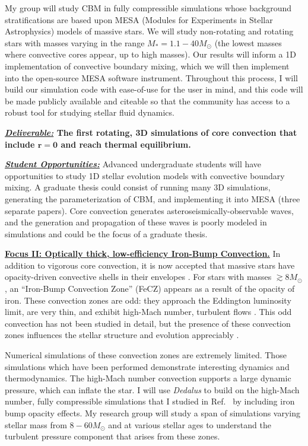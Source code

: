 \documentclass[12pt]{article}
\newcommand{\sct}[1]{\vspace{0.3cm}\hspace{-\parindent}\textbf{\underline{#1}}\hspace{0.3cm}}
\begin{document}
My group will study CBM in fully compressible simulations whose background stratifications are based upon MESA (Modules for Experiments in Stellar Astrophysics) models of massive stars.
We will study non-rotating and rotating stars with masses varying in the range $M_* = 1.1-40 M_{\odot}$ (the lowest masses where convective cores appear, up to high masses).
Our results will inform a 1D implementation of convective boundary mixing, which we will then implement into the open-source MESA software instrument.
Throughout this process, I will build our simulation code with ease-of-use for the user in mind, and this code will be made publicly available and citeable so that the community has access to a robust tool for studying stellar fluid dynamics.

\textbf{\underline{\emph{Deliverable:}} The first rotating, 3D simulations of core convection that include $\boldsymbol{r = 0}$ and reach thermal equilibrium.}

\textbf{\underline{\emph{Student Opportunities:}}} Advanced undergraduate students will have opportunities to study 1D stellar evolution models with convective boundary mixing.
A graduate thesis could consist of running many 3D simulations, generating the parameterization of CBM, and implementing it into MESA (three separate papers).
Core convection generates asteroseismically-observable waves, and the generation and propagation of these waves is poorly modeled in simulations and could be the focus of a graduate thesis.

\sct{Focus II: Optically thick, low-efficiency Iron-Bump Convection.}
In addition to vigorous core convection, it is now accepted that massive stars have opacity-driven convective shells in their envelopes \citep{cantiello_etal_2009}.
For stars with masses $\gtrsim 8 M_{\odot}$, an ``Iron-Bump Convection Zone'' (FeCZ) appears as a result of the opacity of iron.
These convection zones are odd: they approach the Eddington luminosity limit, are very thin, and exhibit high-Mach number, turbulent flows \citep{jermyn_etal_2022_atlas}.
This odd convection has not been studied in detail, but the presence of these convection zones influences the stellar structure and evolution appreciably \citep{kohler_etal_2015}.


Numerical simulations of these convection zones are extremely limited.
Those simulations which have been performed \citep{jiang_etal_2015, schultz_etal_2020} demonstrate interesting dynamics and thermodynamics.
The high-Mach number convection supports a large dynamic pressure, which can inflate the star.
I will use \emph{Dedalus} to build on the high-Mach number, fully compressible simulations that I studied in Ref.~\citep{anders_brown_2017} by including iron bump opacity effects.
My research group will study a span of simulations varying stellar mass from $8-60 M_{\odot}$ and at various stellar ages to understand the turbulent pressure component that arises from these zones.
\end{document}
